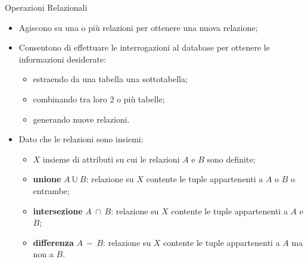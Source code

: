 \begin{frame}{Operazioni Relazionali}
    \begin{itemize}
        \item Agiscono su una o pi\`u relazioni per ottenere una nuova relazione;
        \item Consentono di effettuare le interrogazioni al database per ottenere le informazioni desiderate: \begin{itemize}
            \item estraendo da una tabella una sottotabella;
            \item combinando tra loro 2 o pi\`u tabelle;
            \item generando nuove relazioni. 
        \end{itemize}
        \item Dato che le relazioni sono insiemi:
        \begin{itemize}
            \item $X$ insieme di attributi su cui le relazioni $A$ e $B$ sono definite;
            \item \textbf{unione} $A~\mathbb{U}~B$: relazione su $X$ contente le tuple appartenenti a $A$ o $B$ o entrambe;
            \item \textbf{intersezione} $A~\cap~B$: relazione su $X$ contente le tuple appartenenti a $A$ e $B$;
            \item \textbf{differenza} $A~-~B$: relazione su $X$ contente le tuple appartenenti a $A$ ma non a $B$.
        \end{itemize}
    \end{itemize}
    \end{frame}
